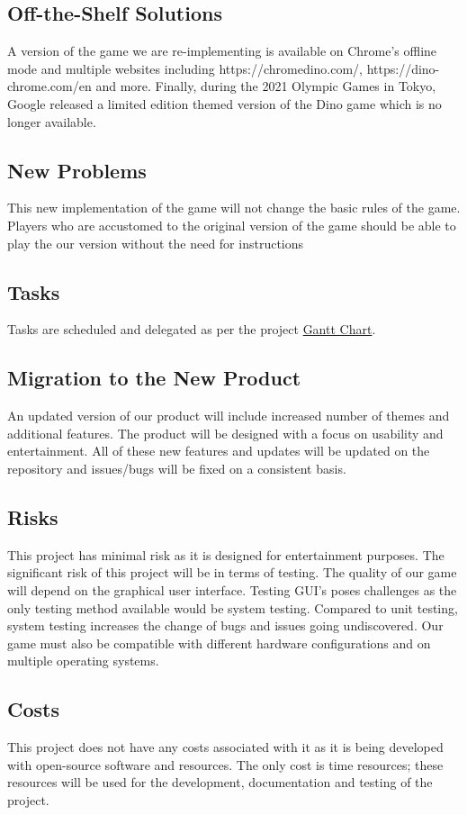 \documentclass[12pt]{article}
\begin{document}
\subsection{Off-the-Shelf Solutions}
A version of the game we are re-implementing is available on Chrome's offline mode and multiple websites including
https://chromedino.com/, https://dino-chrome.com/en and more.
Finally, during the 2021 Olympic Games in Tokyo, Google released
a limited edition themed version of the Dino game which is no longer available. 
\subsection{New Problems}
This new implementation of the game will not change the basic rules of the game.
Players who are accustomed to the original version of the game should be able to play the our version without
the need for instructions
\subsection{Tasks}

Tasks are scheduled and delegated as per the project
\label{subsec:Tasks}
\href{https://gitlab.cas.mcmaster.ca/maramotc/se3xa3/-/blob/main/GanttChart.pdf}{\color{blue}Gantt Chart}.

\subsection{Migration to the New Product}
An updated version of our product will include increased number of themes and additional features. The product will be designed with a focus on usability and entertainment. All of these new features and updates will be updated on the repository and issues/bugs will be fixed on a consistent basis. 

\subsection{Risks}
This project has minimal risk as it is designed for entertainment purposes. The significant risk of this project will be in terms of testing. The quality of our game will depend on the graphical user interface. Testing GUI’s poses challenges as the only testing method available would be system testing. Compared to unit testing, system testing increases the change of bugs and issues going undiscovered. Our game must also be compatible with different hardware configurations and on multiple operating systems.
\subsection{Costs}
This project does not have any costs associated with it as it is being developed with open-source software and resources. The only cost is time resources; these resources will be used for the development, documentation and testing of the project. 
\end{document}

